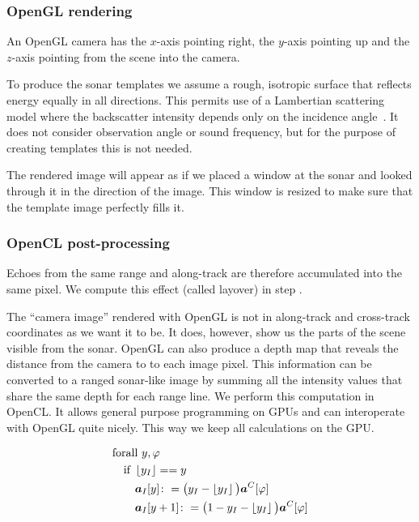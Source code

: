 \subsubsection{OpenGL rendering}

An OpenGL camera has the $x$-axis pointing right, the $y$-axis pointing up and the $z$-axis pointing from the scene into the camera.

To produce the sonar templates we assume a rough, isotropic surface that reflects energy equally in all directions. This permits use of a Lambertian scattering model where the backscatter intensity depends only on the incidence angle~\cite{Zhang1999}. It does not consider observation angle or sound frequency, but for the purpose of creating templates this is not needed.   

The rendered image will appear as if we placed a window at the sonar and looked through it in the direction of the image. This window is resized to make sure that the template image perfectly fills it.


\subsubsection{OpenCL post-processing}

Echoes from the same range and along-track are therefore accumulated into the same pixel. We compute this effect (called layover) in step .

The ``camera image'' rendered with OpenGL is not in along-track and cross-track coordinates as we want it to be. It does, however, show us the parts of the scene visible from the sonar. OpenGL can also produce a depth map that reveals the distance from the camera to to each image pixel. This information can be converted to a ranged sonar-like image by summing all the intensity values that share the same depth for each range line. We perform this computation in OpenCL. It allows general purpose programming on GPUs and can interoperate with OpenGL quite nicely. This way we keep all calculations on the GPU.

\begin{align}
&\text{forall } y,\varphi \nonumber\\
&\quad\text{if }\left\lfloor y_I\right\rfloor == y \nonumber\\
&\qquad\boldsymbol{a}_I[y] \colon= \big(y_I - \left\lfloor y_I\right\rfloor\big)\boldsymbol{a}^C[\varphi] \nonumber\\
&\qquad\boldsymbol{a}_I[y+1] \colon= \big(1 - y_I - \left\lfloor y_I\right\rfloor\big)\boldsymbol{a}^C[\varphi]
\end{align}

